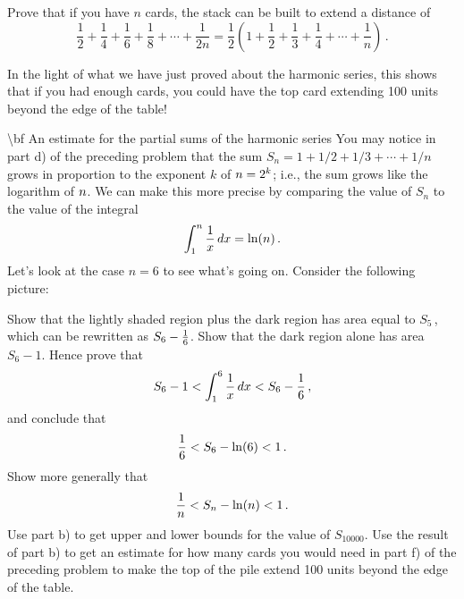{{{{\vspace{2pt}
Prove that if you have $n$ cards, the stack can be built to extend a distance of
\[
\frac{1}{2}+\frac{1}{4}+\frac{1}{6}+\frac{1}{8}+\cdots +\frac{1}{2n}=\frac{1}{2}\left(1+\frac{1}{2}+\frac{1}{3}+\frac{1}{4}+\cdots +\frac{1}{n}\right) \, .
\]

In the light of what we have just proved about the harmonic series, this
shows that if you had enough cards, you could have the top card
extending 100 units beyond the edge of the table!

\num  {\bf An estimate for the partial sums of the harmonic series} \hspace{.5in} You may notice in part d) of the preceding problem that the sum $S_n = 1 + 1/2 + 1/3 + \cdots + 1/n$ grows in proportion to the exponent $k$ of $n=2^k\/$; i.e., the sum grows like the logarithm of $n\/$.  We can make this more precise by comparing the value of $S_n$ to the value of the integral
\[
\int_{1}^{n} {1 \over x} \, dx = \ln(n)\,.
\]
\sub Let's look at the case $n=6$ to see what's going on.  Consider the following picture:

\vspace*{1.8in}

Show that the lightly shaded region plus the dark region has area equal to $S_5$\,, which can be rewritten as $S_6-{1 \over 6}$.  Show that the dark region alone has area $S_6 - 1$. Hence prove that
\[
S_6 - 1 < \int_{1}^{6} {1 \over x} \, dx < S_6-{1 \over 6} \,,
\]
and conclude that
\[
{1 \over 6}<S_6-\ln(6)<1 \,.
\]
\sub Show more generally that
\[
{1 \over n}<S_n-\ln(n)<1 \,.
\]
\sub Use part b) to get upper and lower bounds for the value of $S_{10000}$.
\sub Use the result of part b) to get an estimate for how many cards you would need in part f) of the preceding problem to make the top of the pile extend 100 units beyond the edge of the table.
\medskip


}}}}
